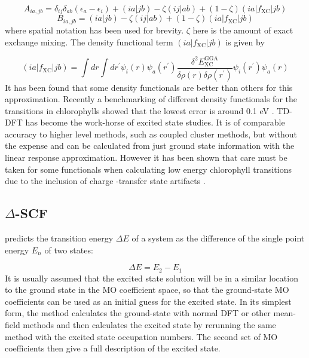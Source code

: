 \begin{equation}
A_{ia, jb} = \delta_{ij} \delta_{ab} \left(\epsilon_a - \epsilon_i \right) + \left(ia|jb\right) - \zeta\left(ij|ab\right) + \left(1-\zeta\right)\left(ia|f_{\text{XC}}|jb\right)
\end{equation}
%
\begin{equation}
B_{ia, jb} = \left(ia|jb\right) - \zeta\left(ij|ab\right) + \left(1-\zeta\right)\left(ia|f_{\text{XC}}|jb\right)
\end{equation}
%
where spatial notation has been used for brevity. $\zeta$ here is the amount of 
exact exchange mixing. The density functional term $\left(ia|f_{\text{XC}}|jb\right)$ 
is given by

\begin{equation}
    \left(ia|f_{\text{XC}}|jb\right) = \int dr \int dr^\prime \psi_i \left(r\right)\psi_a \left(r^\prime\right) \frac{\delta^2 E^{\text{GGA}}_{\text{XC}}}{\delta\rho\left(r\right)\delta\rho\left(r^\prime\right)} \psi_i \left(r^\prime\right)\psi_a \left(r\right)
\end{equation}
%
It has been found that some density functionals are better than others for this
approximation. Recently a benchmarking of different density functionals for the 
\Qy transitions in chlorophylls showed that the lowest error is around 0.1 eV \cite{List2013}. 
TD-DFT has become the work-horse of excited state studies. It is of comparable accuracy
to higher level methods, such as coupled cluster methods, but without the expense \cite{Laurent2013}
and can be calculated from just ground state information with the linear response
approximation. However it has been shown that care must be taken for some functionals
when calculating low energy chlorophyll transitions due to the inclusion of charge
-transfer state artifacts \cite{Dahlbom2005}.

\subsection{$\Delta$-SCF}
\label{subsec{dscf_and_eigdiff}}

\dscf \cite{Jones1989, Hellman2004} predicts the transition energy $\Delta E$ of 
a system as the difference of the single point energy $E_n$ of two states:

\begin{equation}
\Delta E = E_{2} - E_{1}
\end{equation}
%
It is usually assumed that the excited state solution will be in a similar location
to the ground state in the MO coefficient space, so that the ground-state MO coefficients
can be used as an initial guess for the excited state. In its simplest form, the
\dscf method calculates the ground-state with normal DFT or other mean-field methods
and then calculates the excited state by rerunning the same method with the excited
state occupation numbers. The second set of MO coefficients then give a full description
of the excited state.

